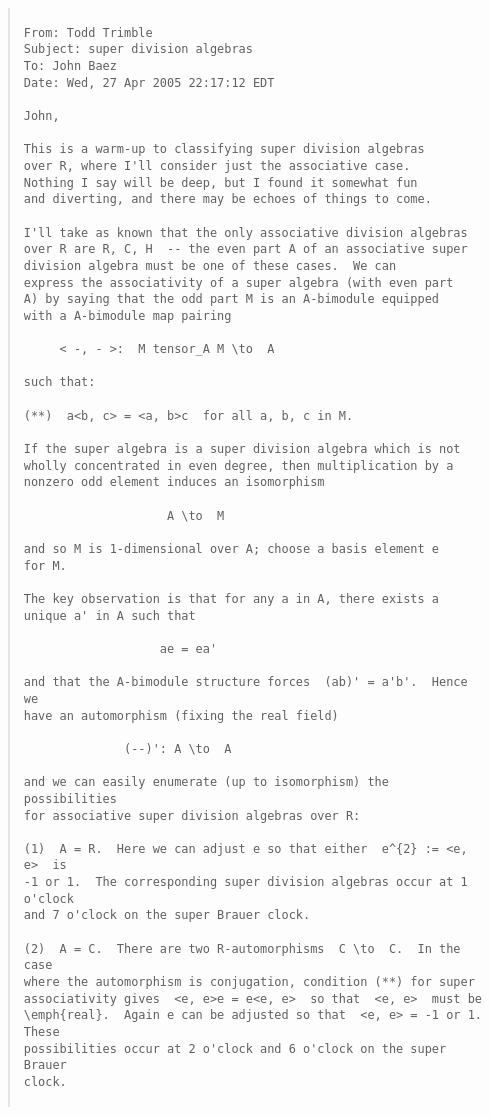 \begin{quote}

\begin{verbatim}

From: Todd Trimble
Subject: super division algebras 
To: John Baez
Date: Wed, 27 Apr 2005 22:17:12 EDT 

John, 
 
This is a warm-up to classifying super division algebras 
over R, where I'll consider just the associative case.  
Nothing I say will be deep, but I found it somewhat fun 
and diverting, and there may be echoes of things to come. 
 
I'll take as known that the only associative division algebras 
over R are R, C, H  -- the even part A of an associative super 
division algebra must be one of these cases.  We can 
express the associativity of a super algebra (with even part 
A) by saying that the odd part M is an A-bimodule equipped 
with a A-bimodule map pairing 
 
     < -, - >:  M tensor_A M \to  A
 
such that:

(**)  a<b, c> = <a, b>c  for all a, b, c in M.  
 
If the super algebra is a super division algebra which is not 
wholly concentrated in even degree, then multiplication by a 
nonzero odd element induces an isomorphism 
 
                    A \to  M
 
and so M is 1-dimensional over A; choose a basis element e 
for M. 
 
The key observation is that for any a in A, there exists a 
unique a' in A such that 
 
                   ae = ea'  
 
and that the A-bimodule structure forces  (ab)' = a'b'.  Hence we 
have an automorphism (fixing the real field) 
 
              (--)': A \to  A
 
and we can easily enumerate (up to isomorphism) the possibilities 
for associative super division algebras over R: 
 
(1)  A = R.  Here we can adjust e so that either  e^{2} := <e, e>  is 
-1 or 1.  The corresponding super division algebras occur at 1 o'clock 
and 7 o'clock on the super Brauer clock. 
 
(2)  A = C.  There are two R-automorphisms  C \to  C.  In the case 
where the automorphism is conjugation, condition (**) for super 
associativity gives  <e, e>e = e<e, e>  so that  <e, e>  must be 
\emph{real}.  Again e can be adjusted so that  <e, e> = -1 or 1.  These 
possibilities occur at 2 o'clock and 6 o'clock on the super Brauer 
clock. 
 

\end{verbatim}
\end{quote}
